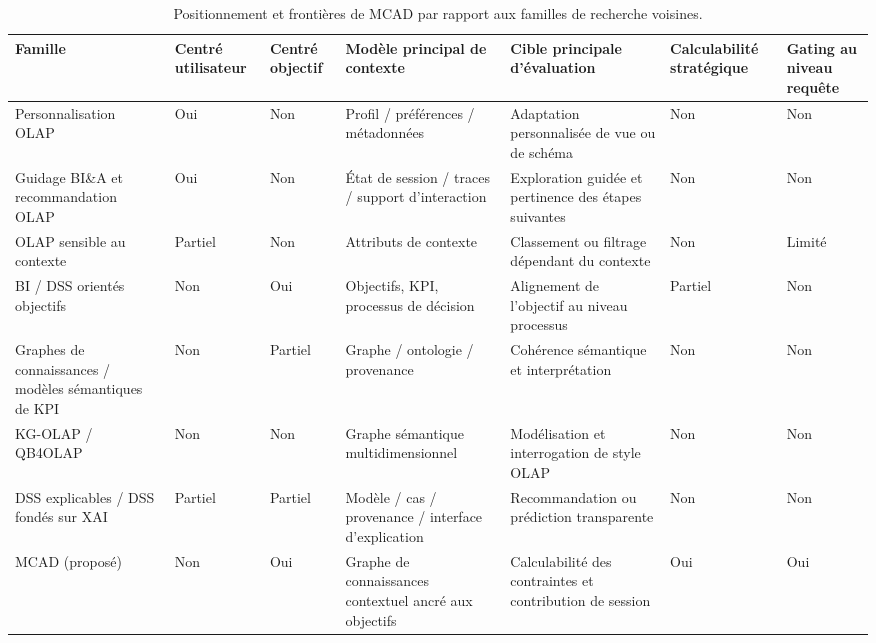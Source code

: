 \documentclass[journal]{IEEEtran}
\begin{document}
\begin{table}[!t]
\centering
\caption{Positionnement et frontières de MCAD par rapport aux familles de recherche voisines.}
\scriptsize
\setlength{\tabcolsep}{3pt}
\begin{tabular}{@{}p{2.65cm}p{1.15cm}p{1.25cm}p{2.15cm}p{2.2cm}p{1.75cm}p{1.55cm}@{}}
\toprule
Famille & Centré utilisateur & Centré objectif & Modèle principal de contexte & Cible principale d'évaluation & Calculabilité stratégique & Gating au niveau requête \\
\midrule
Personnalisation OLAP~\cite{AissiGouider2012,GarrigosER2009,JacobGunklachMaedche2025} & Oui & Non & Profil / préférences / métadonnées & Adaptation personnalisée de vue ou de schéma & Non & Non \\
Guidage BI\&A et recommandation OLAP~\cite{AligonDSS2015,GunklachNadj2023} & Oui & Non & État de session / traces / support d'interaction & Exploration guidée et pertinence des étapes suivantes & Non & Non \\
OLAP sensible au contexte~\cite{RoyContextOLAP2022,AdomaviciusTuzhilin2011} & Partiel & Non & Attributs de contexte & Classement ou filtrage dépendant du contexte & Non & Limité \\
BI / DSS orientés objectifs~\cite{Pourshahid2014} & Non & Oui & Objectifs, KPI, processus de décision & Alignement de l'objectif au niveau processus & Partiel & Non \\
Graphes de connaissances / modèles sémantiques de KPI~\cite{HoganKGSurvey2021,DiamantiniKPISurvey2025,Niedritis2011,StaudingerSchuetzSchrefl2025} & Non & Partiel & Graphe / ontologie / provenance & Cohérence sémantique et interprétation & Non & Non \\
KG-OLAP / QB4OLAP~\cite{Etcheverry2014,SchuetzSerafiniBozzato2021} & Non & Non & Graphe sémantique multidimensionnel & Modélisation et interrogation de style OLAP & Non & Non \\
DSS explicables / DSS fondés sur XAI~\cite{KostopoulosXAIDSS2024} & Partiel & Partiel & Modèle / cas / provenance / interface d'explication & Recommandation ou prédiction transparente & Non & Non \\
MCAD (proposé) & Non & Oui & Graphe de connaissances contextuel ancré aux objectifs & Calculabilité des contraintes et contribution de session & Oui & Oui \\
\bottomrule
\end{tabular}
\normalsize
\label{tab:positioning}
\end{table}
\end{document}

